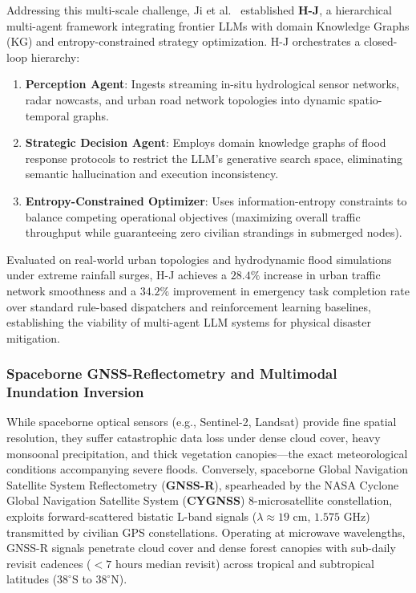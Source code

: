 Addressing this multi-scale challenge, Ji et al.~\cite{ji2025entropy} established \textbf{H-J}, a hierarchical multi-agent framework integrating frontier LLMs with domain Knowledge Graphs (KG) and entropy-constrained strategy optimization. H-J orchestrates a closed-loop hierarchy:
\begin{enumerate}
    \item \textbf{Perception Agent}: Ingests streaming in-situ hydrological sensor networks, radar nowcasts, and urban road network topologies into dynamic spatio-temporal graphs.
    \item \textbf{Strategic Decision Agent}: Employs domain knowledge graphs of flood response protocols to restrict the LLM's generative search space, eliminating semantic hallucination and execution inconsistency.
    \item \textbf{Entropy-Constrained Optimizer}: Uses information-entropy constraints to balance competing operational objectives (maximizing overall traffic throughput while guaranteeing zero civilian strandings in submerged nodes).
\end{enumerate}
Evaluated on real-world urban topologies and hydrodynamic flood simulations under extreme rainfall surges, H-J achieves a $28.4\%$ increase in urban traffic network smoothness and a $34.2\%$ improvement in emergency task completion rate over standard rule-based dispatchers and reinforcement learning baselines, establishing the viability of multi-agent LLM systems for physical disaster mitigation.

\subsubsection{Spaceborne GNSS-Reflectometry and Multimodal Inundation Inversion}
While spaceborne optical sensors (e.g., Sentinel-2, Landsat) provide fine spatial resolution, they suffer catastrophic data loss under dense cloud cover, heavy monsoonal precipitation, and thick vegetation canopies---the exact meteorological conditions accompanying severe floods. Conversely, spaceborne Global Navigation Satellite System Reflectometry (\textbf{GNSS-R}), spearheaded by the NASA Cyclone Global Navigation Satellite System (\textbf{CYGNSS}) 8-microsatellite constellation, exploits forward-scattered bistatic L-band signals ($\lambda \approx 19\text{ cm}$, $1.575\text{ GHz}$) transmitted by civilian GPS constellations. Operating at microwave wavelengths, GNSS-R signals penetrate cloud cover and dense forest canopies with sub-daily revisit cadences ($< 7\text{ hours}$ median revisit) across tropical and subtropical latitudes ($38^\circ\text{S}$ to $38^\circ\text{N}$).

